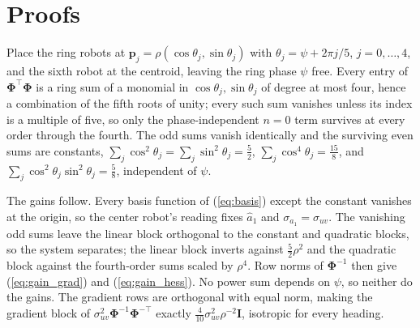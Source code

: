 \documentclass[lettersize,journal]{IEEEtran}
\begin{document}
\appendices

\section{Proofs}
\label{app:proofs}

\begin{IEEEproof}
Place the ring robots at $\mathbf{p}_j = \rho(\cos\theta_j,
\sin\theta_j)$ with $\theta_j = \psi + 2\pi j/5$, $j = 0, \ldots, 4$, and
the sixth robot at the centroid, leaving the ring phase $\psi$ free.
Every entry of $\boldsymbol{\Phi}^\top\boldsymbol{\Phi}$ is a ring sum of
a monomial in $\cos\theta_j, \sin\theta_j$ of degree at most four, hence a
combination of the fifth roots of unity; every such sum vanishes unless
its index is a multiple of five, so only the phase-independent $n = 0$
term survives at every order through the fourth. The odd sums vanish
identically and the surviving even sums are constants,
$\sum_j\cos^2\theta_j = \sum_j\sin^2\theta_j = \tfrac{5}{2}$,
$\sum_j\cos^4\theta_j = \tfrac{15}{8}$, and $\sum_j\cos^2\theta_j
\sin^2\theta_j = \tfrac{5}{8}$, independent of $\psi$.

The gains follow. Every basis function of (\ref{eq:basis}) except the
constant vanishes at the origin, so the center robot's reading fixes
$\hat{a}_1$ and $\sigma_{a_1} = \sigma_{uv}$. The vanishing odd sums
leave the linear block orthogonal to the constant and quadratic blocks,
so the system separates; the linear block inverts against
$\tfrac{5}{2}\rho^2$ and the quadratic block against the fourth-order
sums scaled by $\rho^4$. Row norms of $\boldsymbol{\Phi}^{-1}$ then give
(\ref{eq:gain_grad}) and (\ref{eq:gain_hess}). No power sum depends on
$\psi$, so neither do the gains. The gradient rows are orthogonal with
equal norm, making the gradient block of $\sigma_{uv}^2
\boldsymbol{\Phi}^{-1}\boldsymbol{\Phi}^{-\top}$ exactly
$\tfrac{4}{10}\sigma_{uv}^2\rho^{-2}\mathbf{I}$, isotropic for every
heading.
\end{IEEEproof}
\end{document}

